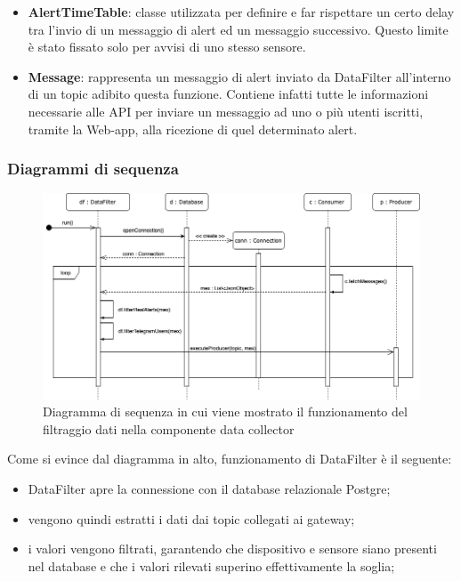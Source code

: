 \begin{landscape}
\begin{itemize}
			\item \textbf{AlertTimeTable}: classe utilizzata per definire e far rispettare un certo delay tra l'invio di un messaggio di alert ed un messaggio successivo. Questo limite è stato fissato solo per avvisi di uno stesso sensore.
			\item \textbf{Message}: rappresenta un messaggio di alert inviato da DataFilter all'interno di un topic adibito questa funzione. Contiene infatti tutte le informazioni necessarie alle API per inviare un messaggio ad uno o più utenti iscritti, tramite la Web-app, alla ricezione di quel determinato alert.
		\end{itemize}
		\end{landscape}
		\begin{landscape}
		\subsubsection{Diagrammi di sequenza}%
			\begin{figure}[H]
				\centering
				\includegraphics[scale=0.550]{res/images/DATACOLLECTOR/DataFilter.ThreadsKafkaDataCollector.png}
				\caption{Diagramma di sequenza in cui viene mostrato il funzionamento del filtraggio dati nella componente data collector}
				\label{Diagramma 7}
			\end{figure}
			Come si evince dal diagramma in alto, funzionamento di DataFilter è il seguente:
			\begin{itemize}
				\item DataFilter apre la connessione con il database relazionale Postgre;
				\item vengono quindi estratti i dati dai topic  collegati ai gateway;
				\item i valori vengono filtrati, garantendo che dispositivo e sensore siano presenti nel database e che i valori rilevati superino effettivamente la soglia;

\end{itemize}
\end{landscape}
